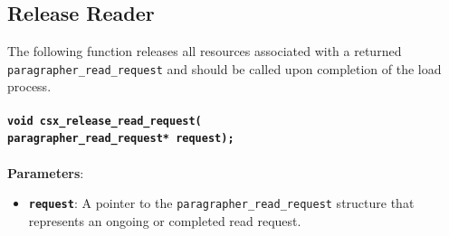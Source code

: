 \documentclass[a4paper]{article}
\begin{document}
\subsection{Release Reader}
    The following function releases all resources associated with a returned \texttt{paragrapher\_read\_request} and
should be called upon completion of the load process.
    ~\\
    \\
    \textbf{\texttt{void csx\_release\_read\_request(
\\{\indent}paragrapher\_read\_request* request);}}
~\\
    \\
\textbf{Parameters}:
\begin{itemize}
    \setlength{\itemsep}{0pt}
    \setlength{\parskip}{0pt}
    \setlength{\parsep}{0pt}
        \item \textbf{\texttt{request}}: A pointer to the \texttt{paragrapher\_read\_request} structure that represents an ongoing or completed read request.
    \end{itemize}
\end{document}
